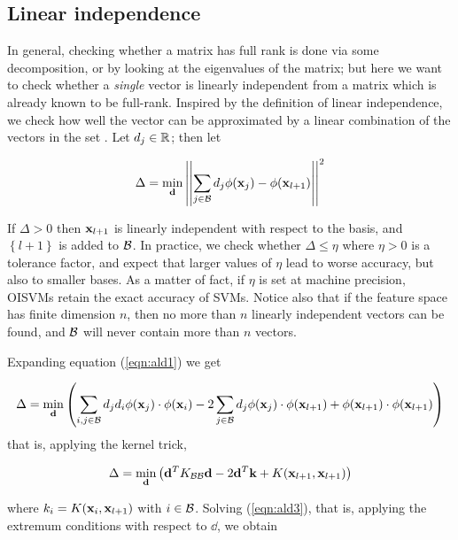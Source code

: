 \subsection{Linear independence}

In general, checking whether a matrix has full rank is done via some
decomposition, or by looking at the eigenvalues of the matrix; but
here we want to check whether a \emph{single} vector is linearly
independent from a matrix which is already known to be
full-rank. Inspired by the definition of linear independence, we check
how well the vector can be approximated by a linear combination of the
vectors in the set \cite{EngelMM02sparse}. Let $d_j \in \mathbb{R}$; then let

\begin{equation} \label{eqn:ald1}
  \Delta = \min_{\mathbf{d}} \left|\left|\sum_{j \in \mathcal{B}} d_j \phi(\mathbf{x}_j) - \phi(\mathbf{x}_{l+1}) \right|\right|^2
\end{equation}

If $\Delta > 0$ then $\mathbf{x}_{l+1}$ is linearly independent with respect
to the basis, and $\left\{l+1\right\}$ is added to $\mathcal{B}$. In practice, we check
whether $\Delta \leq \eta$ where $\eta > 0$ is a tolerance factor, and
expect that larger values of $\eta$ lead to worse accuracy, but also
to smaller bases. As a matter of fact, if $\eta$ is set at machine
precision, OISVMs retain the exact accuracy of SVMs. Notice also that
if the feature space has finite dimension $n$, then no more than $n$
linearly independent vectors can be found, and $\mathcal{B}$ will never contain
more than $n$ vectors.

Expanding equation (\ref{eqn:ald1}) we get

\begin{equation} \label{eqn:ald2}
  \Delta = \min_{\mathbf{d}} \left( \sum_{i,j \in \mathcal{B}} d_j d_i \phi(\mathbf{x}_j) \cdot \phi(\mathbf{x}_i) 
    - 2\sum_{j \in \mathcal{B}} d_j \phi(\mathbf{x}_j) \cdot \phi(\mathbf{x}_{l+1})
    + \phi(\mathbf{x}_{l+1}) \cdot \phi(\mathbf{x}_{l+1}) \right)
\end{equation}
\noindent that is, applying the kernel trick,

\begin{equation} \label{eqn:ald3}
  \Delta = \min_{\mathbf{d}} \left(
      \mathbf{d}^T K_{\mathcal{B}\mathcal{B}}\mathbf{d}
    - 2 \mathbf{d}^T \mathbf{k}
    + K(\mathbf{x}_{l+1},\mathbf{x}_{l+1})
  \right)
\end{equation}

\noindent where $k_i = K(\mathbf{x}_i,\mathbf{x}_{l+1})$ with $i \in \mathcal{B}$. Solving
(\ref{eqn:ald3}), that is, applying the extremum conditions with
respect to $\dd$, we obtain

